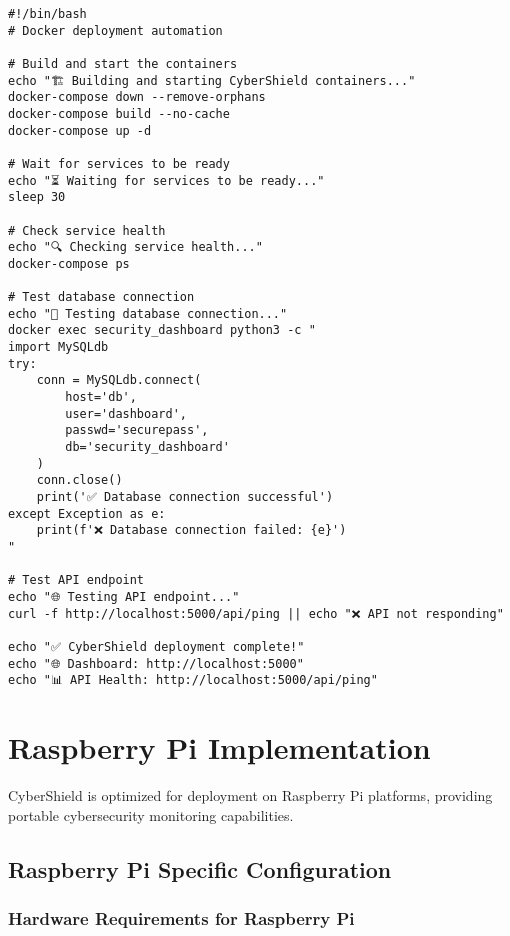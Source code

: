 \documentclass[12pt,a4paper]{report}
\begin{document}
\begin{lstlisting}[style=bashstyle, caption=Docker Deployment Commands]
#!/bin/bash
# Docker deployment automation

# Build and start the containers
echo "🏗️ Building and starting CyberShield containers..."
docker-compose down --remove-orphans
docker-compose build --no-cache
docker-compose up -d

# Wait for services to be ready
echo "⏳ Waiting for services to be ready..."
sleep 30

# Check service health
echo "🔍 Checking service health..."
docker-compose ps

# Test database connection
echo "🔗 Testing database connection..."
docker exec security_dashboard python3 -c "
import MySQLdb
try:
    conn = MySQLdb.connect(
        host='db',
        user='dashboard', 
        passwd='securepass',
        db='security_dashboard'
    )
    conn.close()
    print('✅ Database connection successful')
except Exception as e:
    print(f'❌ Database connection failed: {e}')
"

# Test API endpoint
echo "🌐 Testing API endpoint..."
curl -f http://localhost:5000/api/ping || echo "❌ API not responding"

echo "✅ CyberShield deployment complete!"
echo "🌐 Dashboard: http://localhost:5000"
echo "📊 API Health: http://localhost:5000/api/ping"
\end{lstlisting}

\section{Raspberry Pi Implementation}

CyberShield is optimized for deployment on Raspberry Pi platforms, providing portable cybersecurity monitoring capabilities.

\subsection{Raspberry Pi Specific Configuration}

\subsubsection{Hardware Requirements for Raspberry Pi}
\end{document}
